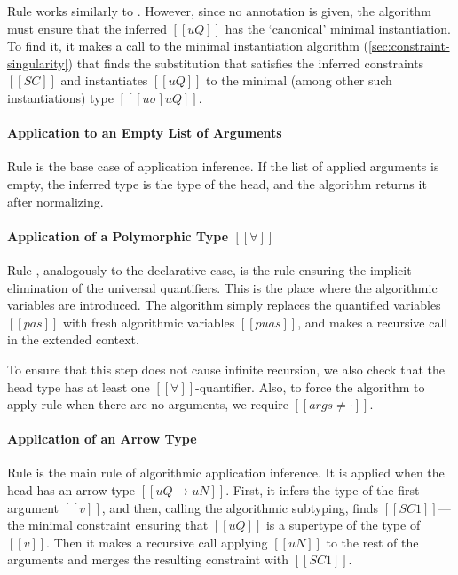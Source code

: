   Rule 
  works similarly to .
  However, since no annotation is given,
  the algorithm must ensure that the inferred $[[uQ]]$
  has the `canonical' minimal instantiation.
  To find it, it makes a call to the minimal instantiation algorithm 
  (\cref{sec:constraint-singularity})
  that finds the substitution that satisfies the inferred constraints $[[SC]]$ and
  instantiates $[[uQ]]$ to the minimal (among other such instantiations)
  type $[[ [uσ]uQ ]]$.

\paragraph{Application to an Empty List of Arguments}
  Rule 
  is the base case of application inference. 
  If the list of applied arguments is empty, 
  the inferred type is the type of the head,
  and the algorithm returns it after normalizing.

\paragraph{Application of a Polymorphic Type $[[∀]]$}
  Rule ,
  analogously to the declarative case,
  is the rule ensuring the implicit elimination of the universal quantifiers. 
  This is the place where the algorithmic variables are introduced.
  The algorithm simply replaces the quantified variables 
  $[[pas]]$ with fresh algorithmic variables $[[puas]]$,
  and makes a recursive call in the extended context.

  To ensure that this step does not cause infinite recursion, 
  we also check that the head type has at least one 
  $[[∀]]$-quantifier. Also, to force the algorithm to
  apply rule  when  
  there are no arguments, we require $[[args ≠ ·]]$.

\paragraph{Application of an Arrow Type}
  Rule 
  is the main rule of algorithmic application inference.
  It is applied when the head has an arrow type $[[uQ → uN]]$.
  First, it infers the type of the first argument $[[v]]$,
  and then, calling the algorithmic subtyping,
  finds $[[SC1]]$---the minimal constraint ensuring that 
  $[[uQ]]$ is a supertype of the type of $[[v]]$.
  Then it makes a recursive call applying $[[uN]]$ to the rest of the arguments 
  and merges the resulting constraint with $[[SC1]]$.


